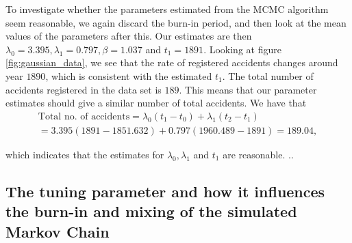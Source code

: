 
To investigate whether the parameters estimated from the MCMC algorithm seem reasonable, we again discard the burn-in period, and then look at the mean values of the parameters after this. Our estimates are then $\lambda_0 = 3.395, \lambda_1 = 0.797 , \beta = 1.037 $ and $t_1 = 1891$. Looking at figure \ref{fig:gaussian_data}, we see that the rate of registered accidents changes around year $1890$, which is consistent with the estimated $t_1$. The total number of accidents registered in the data set is $189$. This means that our parameter estimates should give a similar number of total accidents. We have that
\begin{align}
    \text{Total no. of accidents} = \lambda_0(t_1 - t_0) + \lambda_1(t_2 - t_1) \nonumber \\
    = 3.395(1891-1851.632) + 0.797(1960.489 - 1891) = 189.04, 
\end{align}

which indicates that the estimates for $\lambda_0, \lambda_1$ and $t_1$ are reasonable. ..



\subsection{The tuning parameter and how it influences the burn-in and mixing of the simulated Markov Chain}

